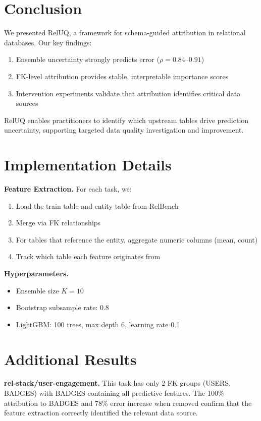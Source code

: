 \documentclass{article}
\begin{document}
\section{Conclusion}

We presented RelUQ, a framework for schema-guided attribution in relational databases.
Our key findings:
\begin{enumerate}
    \item Ensemble uncertainty strongly predicts error ($\rho = 0.84$--$0.91$)
    \item FK-level attribution provides stable, interpretable importance scores
    \item Intervention experiments validate that attribution identifies critical data sources
\end{enumerate}
RelUQ enables practitioners to identify which upstream tables drive prediction
uncertainty, supporting targeted data quality investigation and improvement.




\newpage
\appendix

\section{Implementation Details}
\label{app:implementation}

\textbf{Feature Extraction.}
For each task, we:
\begin{enumerate}
    \item Load the train table and entity table from RelBench
    \item Merge via FK relationships
    \item For tables that reference the entity, aggregate numeric columns (mean, count)
    \item Track which table each feature originates from
\end{enumerate}

\textbf{Hyperparameters.}
\begin{itemize}
    \item Ensemble size $K = 10$
    \item Bootstrap subsample rate: 0.8
    \item LightGBM: 100 trees, max depth 6, learning rate 0.1
\end{itemize}

\section{Additional Results}
\label{app:results}

\textbf{rel-stack/user-engagement.}
This task has only 2 FK groups (USERS, BADGES) with BADGES containing all predictive
features. The 100\% attribution to BADGES and 78\% error increase when removed
confirm that the feature extraction correctly identified the relevant data source.
\end{document}
